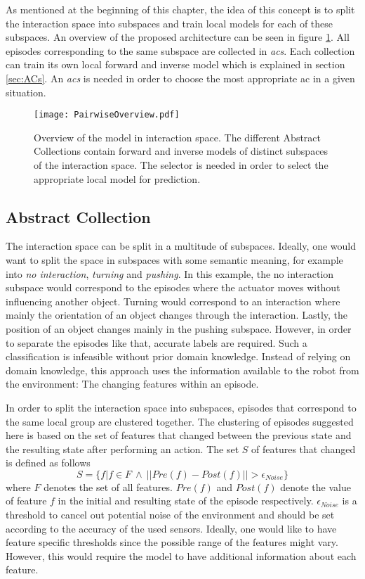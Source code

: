 As mentioned at the beginning of this chapter, the idea of this concept is to split the interaction space into subspaces and train local models for each of these subspaces. 
An overview of the proposed architecture can be seen in figure \ref{fig:PairOverview}.
All episodes corresponding to the same subspace are collected in \textit{\glspl{ac}}. Each collection can train its own local forward and inverse model which is explained in section \ref{sec:ACs}.
An \textit{\gls{acs}} is needed in order to choose the most appropriate \gls{ac} in a given situation. 


\begin{figure}
	\centering
	\texttt{[image: PairwiseOverview.pdf]}
	\caption{Overview of the model in interaction space. The different Abstract Collections contain forward and inverse models of distinct subspaces of the interaction space. The selector is needed in order to select the appropriate local model for prediction.}
	\label{fig:PairOverview}
\end{figure}

\subsection{Abstract Collection \label{sec:ACs}}

The interaction space can be split in a multitude of subspaces. Ideally, one would want to split the space in subspaces with some semantic meaning, for example into \textit{no interaction}, \textit{turning} and \textit{pushing}. In this example, the no interaction subspace would correspond to the episodes where the actuator moves without influencing another object. Turning would correspond to an interaction where mainly the orientation of an object changes through the interaction. Lastly, the position of an object changes mainly in the pushing subspace. However, in order to separate the episodes like that, accurate labels are required. Such a classification is infeasible without prior domain knowledge. 
Instead of relying on domain knowledge, this approach uses the information available to the robot from the environment: The changing features within an episode.

In order to split the interaction space into subspaces, episodes that correspond to the same local group are clustered together.
The clustering of episodes suggested here is based on the set of features that changed between the previous state and the resulting state after performing an action. The set $S$ of features that changed is defined as follows 
\begin{equation}
S = \{f | f \in F ~ \wedge ~ ||Pre(f)-Post(f)|| > \epsilon_{Noise}\}
\label{eq:difSet}
\end{equation}
where $F$ denotes the set of all features. $Pre(f)$ and $Post(f)$ denote the value of 
feature $f$ in the initial and resulting state of the episode respectively. $\epsilon_{Noise}$ is a threshold to cancel out potential noise of the environment and should be set according to the accuracy of the used sensors. Ideally, one would like to have feature specific thresholds since the possible range of the features might vary. However, this would require the model to have additional information about each feature.

